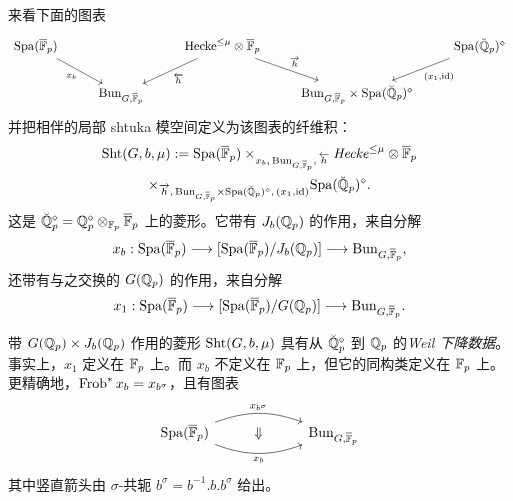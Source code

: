 来看下面的图表
\begin{equation*}
\begin{tikzcd}
\Spa(\ol{\FF}_p) \arrow[dr,"x_b"']
& & \mathrm{Hecke}^{\le\mu}\otimes\ol{\FF}_p \arrow[dl,"\overleftarrow{h}"] \arrow[dr,"\overrightarrow{h}"]
& & \Spa(\breve{\QQ}_p)^{\diamond} \arrow[dl,"{(x_1,\id)}"] \\
& \Bun_{G,\ol{\FF}_p} & & \Bun_{G,\ol{\FF}_p}\times\Spa(\breve{\QQ}_p)^{\diamond} &
\end{tikzcd}
\end{equation*}
并把相伴的局部 shtuka 模空间定义为该图表的纤维积：
\begin{gather*}
\operatorname{Sht}(G,b,\mu):=\mathrm{Spa}(\overline{\mathbb{F}}_p)\times_{x_b,\,\mathrm{Bun}_{G,\overline{\mathbb{F}}_p},\,\overleftarrow{h}}\mathit{Hecke}^{\le\mu}\otimes\overline{\mathbb{F}}_p\\
\times_{\overrightarrow{h},\,\mathrm{Bun}_{G,\overline{\mathbb{F}}_p}\times\mathrm{Spa}(\breve{\mathbb{Q}}_p)^{\diamond},\,(x_1,\operatorname{id})}\mathrm{Spa}(\breve{\mathbb{Q}}_p)^{\diamond}.
\end{gather*}
这是 $\breve{\mathbb{Q}}_p^{\diamond}=\mathbb{Q}_p^{\diamond}\otimes_{\mathbb{F}_p}\overline{\mathbb{F}}_p$ 上的菱形。它带有 $J_b(\mathbb{Q}_p)$ 的作用，来自分解
\[
x_b:\mathrm{Spa}(\overline{\mathbb{F}}_p)\longrightarrow[\mathrm{Spa}(\overline{\mathbb{F}}_p)/J_b(\mathbb{Q}_p)]\longrightarrow\mathrm{Bun}_{G,\overline{\mathbb{F}}_p},
\]
还带有与之交换的 $G(\mathbb{Q}_p)$ 的作用，来自分解
\[
x_1:\mathrm{Spa}(\overline{\mathbb{F}}_p)\longrightarrow[\mathrm{Spa}(\overline{\mathbb{F}}_p)/G(\mathbb{Q}_p)]\longrightarrow\mathrm{Bun}_{G,\overline{\mathbb{F}}_p}.
\]

带 $G(\mathbb{Q}_p)\times J_b(\mathbb{Q}_p)$ 作用的菱形 $\operatorname{Sht}(G,b,\mu)$ 具有从 $\breve{\mathbb{Q}}_p^{\diamond}$ 到 $\mathbb{Q}_p$ 的\emph{Weil 下降数据}。事实上，$x_1$ 定义在 $\mathbb{F}_p$ 上。而 $x_b$ 不定义在 $\mathbb{F}_p$ 上，但它的同构类定义在 $\mathbb{F}_p$ 上。更精确地，$\operatorname{Frob}^*x_b=x_{b^{\sigma}}$，且有图表
\begin{equation*}
\begin{tikzcd}
\Spa(\ol{\FF}_p) \arrow[rr,bend left=20,"x_{b^{\sigma}}"] \arrow[rr,bend right=20,"x_b"'] & {\Downarrow} & \Bun_{G,\ol{\FF}_p}
\end{tikzcd}
\end{equation*}
其中竖直箭头由 $\sigma$-共轭 $b^{\sigma}=b^{-1}.b.b^{\sigma}$ 给出。

